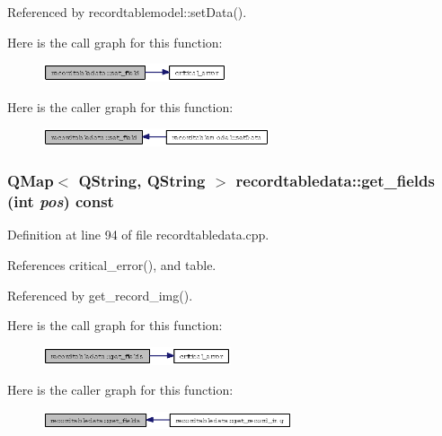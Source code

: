 Referenced by recordtablemodel::set\-Data().

Here is the call graph for this function:\begin{figure}[H]
\begin{center}
\leavevmode
\includegraphics[width=153pt]{classrecordtabledata_700883543df1f758a8d9b6ceb69a98be_cgraph}
\end{center}
\end{figure}


Here is the caller graph for this function:\begin{figure}[H]
\begin{center}
\leavevmode
\includegraphics[width=189pt]{classrecordtabledata_700883543df1f758a8d9b6ceb69a98be_icgraph}
\end{center}
\end{figure}
\subsubsection{\setlength{\rightskip}{0pt plus 5cm}QMap$<$ QString, QString $>$ recordtabledata::get\_\-fields (int {\em pos}) const}\label{classrecordtabledata_bb59c7c87809612f261d087b3ea14d94}




Definition at line 94 of file recordtabledata.cpp.

References critical\_\-error(), and table.

Referenced by get\_\-record\_\-img().

Here is the call graph for this function:\begin{figure}[H]
\begin{center}
\leavevmode
\includegraphics[width=157pt]{classrecordtabledata_bb59c7c87809612f261d087b3ea14d94_cgraph}
\end{center}
\end{figure}


Here is the caller graph for this function:\begin{figure}[H]
\begin{center}
\leavevmode
\includegraphics[width=208pt]{classrecordtabledata_bb59c7c87809612f261d087b3ea14d94_icgraph}
\end{center}
\end{figure}
